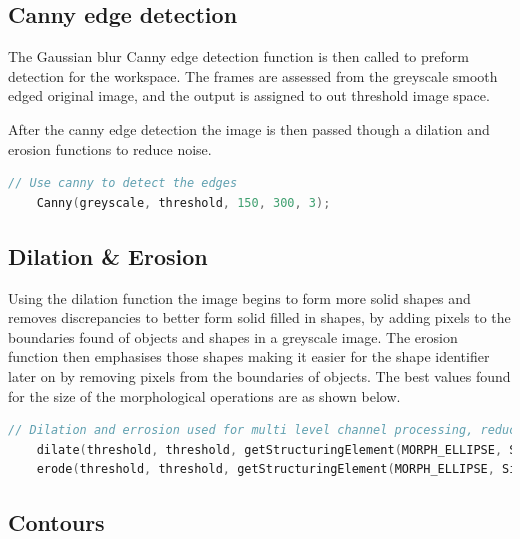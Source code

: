 \documentclass[a4paper, 10pt]{article}
\begin{document}

\subsection{Canny edge detection}

The Gaussian blur Canny edge detection function is then called to preform detection for the workspace. The frames are assessed from the greyscale smooth edged original image, and the output is assigned to out threshold image space.
 
After the canny edge detection the image is then passed though a dilation and erosion functions to reduce noise.

\begin{lstlisting}[language = C++]
	// Use canny to detect the edges
	Canny(greyscale, threshold, 150, 300, 3);
\end{lstlisting}


\subsection{Dilation \& Erosion}

Using the dilation function the image begins to form more solid shapes and removes discrepancies to better form solid filled in shapes, by adding pixels to the boundaries found of objects and shapes in a greyscale image. The erosion function then emphasises those shapes making it easier for the shape identifier later on by removing pixels from the boundaries of objects. The best values found for the size of the morphological operations are as shown below.

\begin{lstlisting}[language = C++]
	// Dilation and errosion used for multi level channel processing, reduced noise
	dilate(threshold, threshold, getStructuringElement(MORPH_ELLIPSE, Size(5, 5)));
	erode(threshold, threshold, getStructuringElement(MORPH_ELLIPSE, Size(5, 5)));
\end{lstlisting}


\subsection{Contours}
\end{document}
